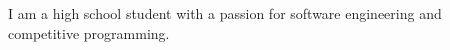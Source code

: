 

\begin{cvparagraph}I am a high school student with a passion for software engineering and competitive programming.\end{cvparagraph}